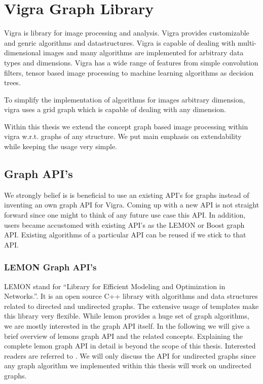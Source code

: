 


\bigskip
\chapter{Vigra Graph Library} \label{ch:vigra_graph_lib}

Vigra \cite{software_vigra} is library for image processing and analysis.
Vigra provides customizable and genric algorithms and datastructures.
Vigra is capable of dealing with multi-dimensional images 
and many algorithms are implemented for arbitrary data types
and dimensions.
Vigra has a wide range of features from simple convolution filters, 
tensor based image processing to machine learning algorithms 
as decision trees.

To simplify the implementation of algorithms for images arbitrary 
dimension, vigra uses a grid graph which is capable of
dealing with any dimension.

Within this thesis we extend the concept graph based image processing
within vigra w.r.t. graphs of any structure.
We put main emphasis on extendability while keeping the usage very simple.


\section{Graph API's}\label{sec:graph_apis}

We strongly belief is is beneficial to use an existing API's for
graphs instead of inventing an own graph API for Vigra.
Coming up with a new API is not straight forward
since one might to think of any future use case this API.
In addition, users became accustomed with existing API's as 
the LEMON or Boost graph API.
Existing algorithms of a particular API can be reused if we stick
to that API.




\subsection{LEMON Graph API's}\label{sec:lemon_graph_apis}
    LEMON \citet{ software_lemon} 
    stand for  ``Library for Efficient Modeling and Optimization in Networks.''.
    It is an open source C++ library with algorithms and data structures 
    related to directed and undirected graphs.
    The extensive usage of templates make this library very flexible.
    While lemon provides a huge set of graph algorithms,
    we are mostly interested in the graph API itself.
    In the following we will give a brief overview of lemons graph 
    API and the related concepts.
    Explaining the complete lemon graph API in detail
    is beyond the scope of this thesis.
    Interested readers are referred to \citet{software_lemon}.
    We will only discuss the API for undirected graphs since any
    graph algorithm we implemented within this thesis
    will work on undirected graphs.

